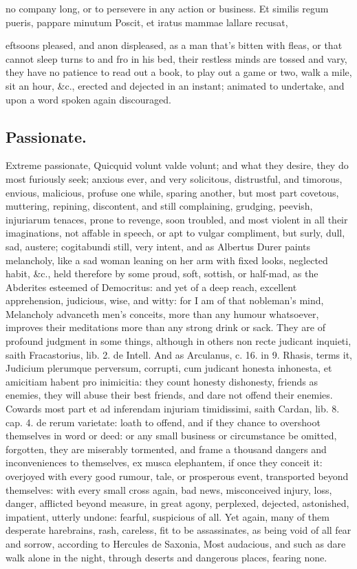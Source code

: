 {no company long, or to persevere in any action or business.
Et similis regum pueris, pappare minutum
Poscit, et iratus mammae lallare recusat,

eftsoons pleased, and anon displeased, as a man that's bitten with
fleas, or that cannot sleep turns to and fro in his bed, their restless
minds are tossed and vary, they have no patience to read out a book, to
play out a game or two, walk a mile, sit an hour, \&c., erected and
dejected in an instant; animated to undertake, and upon a word spoken
again discouraged.

\subsection{Passionate.}
Extreme passionate, Quicquid volunt valde volunt; and
what they desire, they do most furiously seek; anxious ever, and very
solicitous, distrustful, and timorous, envious, malicious, profuse one
while, sparing another, but most part covetous, muttering, repining,
discontent, and still complaining, grudging, peevish, injuriarum
tenaces, prone to revenge, soon troubled, and most violent in all their
imaginations, not affable in speech, or apt to vulgar compliment, but
surly, dull, sad, austere; cogitabundi still, very intent, and as
 Albertus Durer paints melancholy, like a sad woman leaning on
her arm with fixed looks, neglected habit, \&c., held therefore by some
proud, soft, sottish, or half-mad, as the Abderites esteemed of
Democritus: and yet of a deep reach, excellent apprehension, judicious,
wise, and witty: for I am of that nobleman's mind, Melancholy
advanceth men's conceits, more than any humour whatsoever, improves
their meditations more than any strong drink or sack. They are of
profound judgment in some things, although in others non recte judicant
inquieti, saith Fracastorius, lib. 2. de Intell. And as Arculanus, c.
16. in 9. Rhasis, terms it, Judicium plerumque perversum, corrupti, cum
judicant honesta inhonesta, et amicitiam habent pro inimicitia: they
count honesty dishonesty, friends as enemies, they will abuse their
best friends, and dare not offend their enemies. Cowards most part et
ad inferendam injuriam timidissimi, saith Cardan, lib. 8. cap. 4. de
rerum varietate: loath to offend, and if they chance to overshoot
themselves in word or deed: or any small business or circumstance be
omitted, forgotten, they are miserably tormented, and frame a thousand
dangers and inconveniences to themselves, ex musca elephantem, if once
they conceit it: overjoyed with every good rumour, tale, or prosperous
event, transported beyond themselves: with every small cross again, bad
news, misconceived injury, loss, danger, afflicted beyond measure, in
great agony, perplexed, dejected, astonished, impatient, utterly
undone: fearful, suspicious of all. Yet again, many of them desperate
harebrains, rash, careless, fit to be assassinates, as being void of
all fear and sorrow, according to Hercules de Saxonia, Most
audacious, and such as dare walk alone in the night, through deserts
and dangerous places, fearing none.

}
